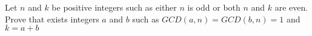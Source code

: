 Let $ n$ and $ k$ be positive integers such as either $ n$ is odd or both $ n$ and $ k$ are even. Prove that exists integers $ a$ and $ b$ such as $ GCD(a,n) = GCD(b,n) = 1$ and $ k = a + b$